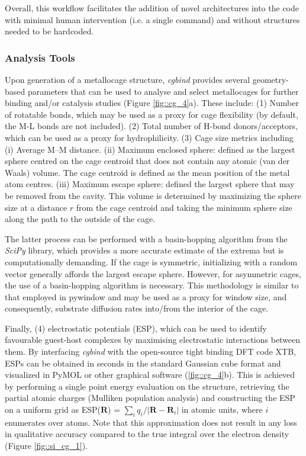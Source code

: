 \documentclass[../../main.tex]{subfiles}
\newcommand{\cgbind}{\emph{cgbind }}
\begin{document}
Overall, this workflow facilitates the addition of novel architectures into the code with minimal human intervention (i.e. a single command) and without structures needed to be hardcoded.


\subsubsection{Analysis Tools} 

Upon generation of a metallocage structure, \cgbind provides several geometry-based parameters that can be used to analyse and select metallocages for further binding and/or catalysis studies (Figure \ref{fig::cg_4}a). These include: (1) Number of rotatable bonds, which may be used as a proxy for cage flexibility (by default, the M-L bonds are not included).
(2) Total number of H-bond donors/acceptors, which can be used as a proxy for hydrophilicity. (3) Cage size metrics including  (i)	Average M–M distance.
(ii)	Maximum enclosed sphere: defined as the largest sphere centred on the cage centroid that does not contain any atomic (van der Waals) volume. The cage centroid is defined as the mean position of the metal atom centres.
(iii)	Maximum escape sphere: defined the largest sphere that may be removed from the cavity. This volume is determined by maximizing the sphere size at a distance $r$ from the cage centroid and taking the minimum sphere size along the path to the outside of the cage. 

The latter process can be performed with a basin-hopping algorithm from the \emph{SciPy} library, which provides a more accurate estimate of the extrema but is computationally demanding.\cite{Wales1997} If the cage is symmetric, initializing with a random vector generally affords the largest escape sphere. However, for asymmetric cages, the use of a basin-hopping algorithm is necessary. This methodology is similar to that employed in pywindow\cite{Miklitz2018} and may be used as a proxy for window size, and consequently, substrate diffusion rates into/from the interior of the cage. 

Finally, (4) electrostatic potentials (ESP), which can be used to identify favourable guest-host complexes by maximising electrostatic interactions between them. By interfacing \cgbind with the open-source tight binding DFT code XTB,\cite{Bannwarth2019} ESPs can be obtained in seconds in the standard Gaussian cube format and visualized in PyMOL or other graphical software (\ref{fig::cg_4}b). This is achieved by performing a single point energy evaluation on the structure, retrieving the partial atomic charges (Mulliken population analysis) and constructing the ESP on a uniform grid as ESP($\boldsymbol{R}$) = $\sum_i q_i/|\boldsymbol{R} - \boldsymbol{R}_i|$ in atomic units, where $i$ enumerates over atoms. Note that this approximation does not result in any loss in qualitative accuracy compared to the true integral over the electron density (Figure \ref{fig::si_cg_1}). 
\end{document}
